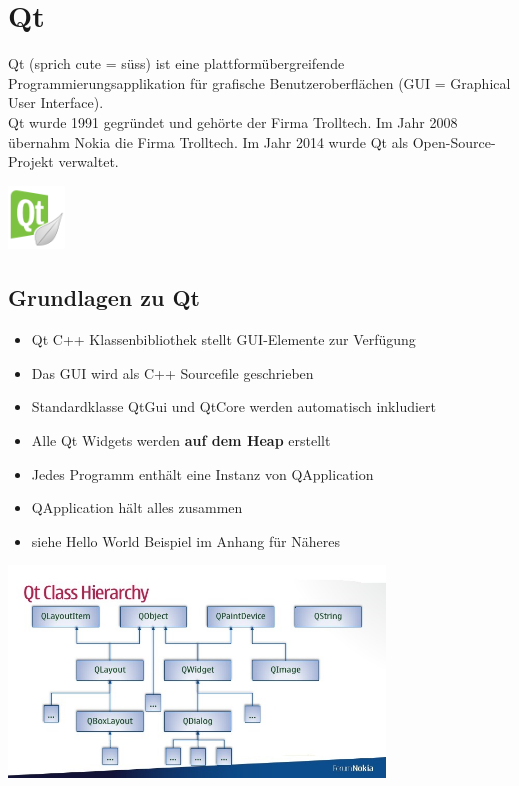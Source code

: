 \section{Qt}
\begin{minipage}{16cm}
	Qt (sprich cute = süss) ist eine plattformübergreifende Programmierungsapplikation für grafische \newline Benutzeroberflächen
    (GUI = Graphical User Interface).\\
	Qt wurde 1991 gegründet und gehörte der Firma Trolltech.
    Im Jahr 2008 übernahm Nokia die Firma Trolltech. Im Jahr 2014 wurde Qt als Open-Source-Projekt verwaltet. 
\end{minipage}
\begin{minipage}{1.5cm}
	\includegraphics[width=1.5cm]{images/qt_logo.jpg}
\end{minipage}

\subsection{Grundlagen zu Qt}
\begin{minipage}{8cm}
	\begin{itemize}
		\item Qt C++ Klassenbibliothek stellt GUI-Elemente zur Verfügung
		\item Das GUI wird als C++ Sourcefile geschrieben
		\item Standardklasse QtGui und QtCore werden \newline automatisch inkludiert
		\item Alle Qt Widgets werden \textbf{auf dem Heap} erstellt
		\item Jedes Programm enthält eine Instanz von QApplication
		\item QApplication hält alles zusammen
		\item siehe Hello World Beispiel im Anhang für \newline Näheres
	\end{itemize}
\end{minipage}
\begin{minipage}{10cm}
	\includegraphics[width=10cm]{images/qt_classes.jpg}
\end{minipage}


